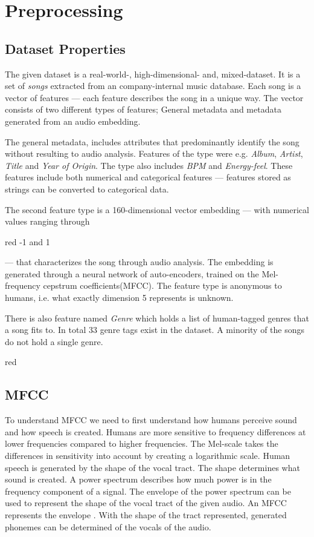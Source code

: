 \documentclass[../report.tex]{subfiles}
\begin{document}

\section{Preprocessing}
\subsection{Dataset Properties}
The given dataset is a real-world-, high-dimensional- and, mixed-dataset. It is a set of \textit{songs} extracted from an company-internal music database. Each song is a vector of features --- each feature describes the song in a unique way. The vector consists of two different types of features; General metadata and metadata generated from an audio embedding.

The general metadata, includes attributes that predominantly identify the song without resulting to audio analysis. Features of the type were e.g. \textit{Album}, \textit{Artist}, \textit{Title} and \textit{Year of Origin}. The type also includes \textit{BPM} and \textit{Energy-feel}. These features include both numerical and categorical features --- features stored as strings can be converted to categorical data.

The second feature type is a 160-dimensional vector embedding --- with numerical values ranging through \begin{color}{red}{ -1 and 1 }\end{color} --- that characterizes the song through audio analysis. The embedding is generated through a neural network of auto-encoders, trained on the Mel-frequency cepstrum coefficients(MFCC)\cite{Paliwal2010}. The feature type is anonymous to humans, i.e. what exactly dimension 5 represents is unknown.

There is also feature named \textit{Genre} which holds a list of human-tagged genres that a song fits to. In total 33 genre tags exist in the dataset.
A minority of the songs do not hold a single genre.


\begin{color}{red}{
\subsection{MFCC}
To understand MFCC we need to first understand how humans perceive sound and how speech is created. Humans are more sensitive to frequency differences at lower frequencies compared to higher frequencies. The Mel-scale takes the differences in sensitivity into account by creating a logarithmic scale. Human speech is generated by the shape of the vocal tract. The shape determines what sound is created.
A power spectrum describes how much power is in the frequency component of a signal. The envelope of the power spectrum can be used to represent the shape of the vocal tract of the given audio. An MFCC represents the envelope \cite{Paliwal2010}. With the shape of the tract represented, generated phonemes can be determined of the vocals of the audio.
}\end{color}
\end{document}
